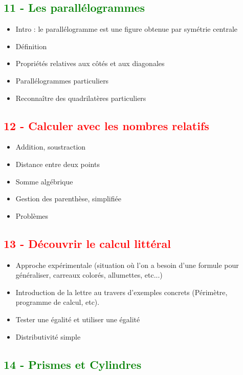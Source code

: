 \documentclass[12pt]{article}
\begin{document}
\begin{multicols}{2}
\subsection*{\textcolor{green}{11 - Les parallélogrammes}}

\begin{itemize}
\item Intro : le parallélogramme est une figure obtenue par symétrie centrale
\item Définition
\item Propriétés relatives aux côtés et aux diagonales
\item Parallélogrammes particuliers
\item Reconnaître des quadrilatères particuliers
\end{itemize}

\subsection*{\textcolor{red}{12 - Calculer avec les nombres relatifs}}

\begin{itemize}
\item Addition, soustraction
\item Distance entre deux points
\item Somme algébrique
\item Gestion des parenthèse, simplifiée
\item Problèmes
\end{itemize}

\columnbreak

\subsection*{\textcolor{red}{13 - Découvrir le calcul littéral}}

\begin{itemize}
\item Approche expérimentale (situation où l'on a besoin d'une formule pour généraliser, carreaux colorés, allumettes, etc...)
\item Introduction de la lettre au travers d'exemples concrets (Périmètre, programme de calcul, etc).
\item Tester une égalité et utiliser une égalité
\item Distributivité simple
\end{itemize}

\subsection*{\textcolor{green}{14 - Prismes et Cylindres}}


\end{multicols}
\end{document}
